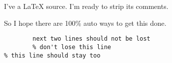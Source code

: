 I've a LaTeX source.
I'm ready
to strip its comments.

So I hope there are
100\% auto
ways to get this done.



\begin{verbatim}
        next two lines should not be lost
        % don't lose this line
% this line should stay too
\end{verbatim}
